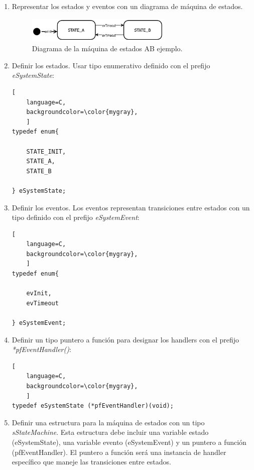 \begin{enumerate}
\item Representar los estados y eventos con un diagrama de máquina de estados.
\begin{figure}[ht]
	\centering
	\includegraphics[width=0.66\textwidth]{./Figures/statemachineAB.png}
	\caption{Diagrama de la máquina de estados AB ejemplo.}
	\label{fig:fsmAB}
\end{figure}

\item Definir los estados. Usar tipo enumerativo definido con el prefijo \textit{eSystemState}:

\begin{lstlisting}[
	language=C, 
	backgroundcolor=\color{mygray},
	]
typedef enum{

    STATE_INIT,
	STATE_A,
	STATE_B

} eSystemState;
\end{lstlisting}

\item Definir los eventos. Los eventos representan transiciones entre estados con un tipo definido con el prefijo \textit{eSystemEvent}:

\begin{lstlisting}[
	language=C, 
	backgroundcolor=\color{mygray},
	]
typedef enum{

	evInit,
	evTimeout

} eSystemEvent;
\end{lstlisting}

\item Definir un tipo puntero a función para designar los handlers con el prefijo \textit{*pfEventHandler()}:

\begin{lstlisting}[
	language=C, 
	backgroundcolor=\color{mygray},
	]
typedef eSystemState (*pfEventHandler)(void);
\end{lstlisting}

\item Definir una estructura para la máquina de estados con un tipo \textit{sStateMachine}. Esta estructura debe incluir una variable estado (eSystemState), una variable evento (eSystemEvent) y un puntero a función (pfEventHandler). El puntero a función será una instancia de handler específico que maneje las transiciones entre estados. 


\end{enumerate}

